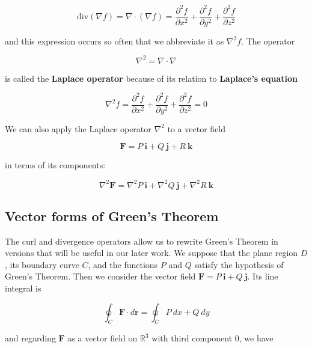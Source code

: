 \documentclass{article}
\begin{document}
\begin{equation*}
    \text{div}(\nabla f) = \nabla \cdot (\nabla f) = \frac{\partial^2 f}{\partial x^2} + \frac{\partial^2 f}{\partial y^2} + \frac{\partial^2 f} {\partial z^2} 
\end{equation*}

and this expression occurs so often that we abbreviate it as $\nabla^2 f$. The operator

\begin{equation*}
    \nabla^2 = \nabla \cdot \nabla
\end{equation*}

is called the \textbf{Laplace operator} because of its relation to \textbf{Laplace's equation}

\begin{equation*}
    \nabla^2 f = \frac{\partial^2 f}{\partial x^2} + \frac{\partial^2 f}{\partial y^2} + \frac{\partial^2 f} {\partial z^2}  = 0
\end{equation*}

We can also apply the Laplace operator $\nabla^2$ to a vector field

\begin{equation*}
    \mathbf{F} = P \ \mathbf{i} + Q \ \mathbf{j} + R \ \mathbf{k}
\end{equation*}

in terms of its components:

\begin{equation*}
    \nabla^2 \mathbf{F} = \nabla^2 P \ \mathbf{i} + \nabla^2 Q \ \mathbf{j} + \nabla^2 R \ \mathbf{k}
\end{equation*}

\subsection{Vector forms of Green's Theorem}

The curl and divergence operators allow us to rewrite Green's Theorem in versions that will be useful in our later work. We suppose that the plane region $D$, its boundary curve $C$, and the functions $P$ and $Q$ satisfy the hypothesis of Green's Theorem. Then we consider the vector field $\mathbf{F} = P \ \mathbf{i} + Q \ \mathbf{j}$. Its line integral is 

\begin{equation*}
    \oint_C \mathbf{F} \cdot d \mathbf{r} = \oint_C P \ dx + Q \ dy
\end{equation*}

and regarding $\mathbf{F}$ as a vector field on $\mathbb{R}^3$ with third component 0, we have 
\end{document}
